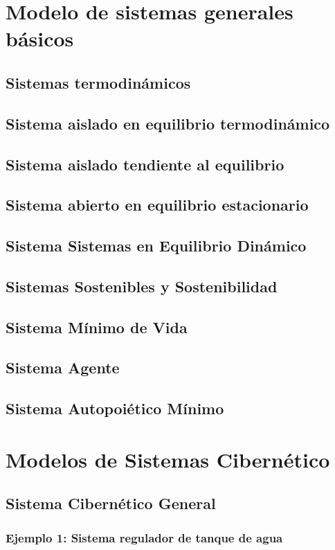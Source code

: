 \section{Modelo de sistemas generales básicos}
\subsection{Sistemas termodinámicos}
\subsection{Sistema aislado en equilibrio termodinámico}
\subsection{Sistema aislado tendiente al equilibrio}
\subsection{Sistema abierto en equilibrio estacionario}
\subsection{Sistema Sistemas en Equilibrio Dinámico}
\subsection{Sistemas Sostenibles y Sostenibilidad}
\subsection{Sistema Mínimo de Vida}
\subsection{Sistema Agente}
\subsection{Sistema Autopoiético Mínimo}
\section{Modelos de Sistemas Cibernético}

\subsection{Sistema Cibernético General}
\subsubsection{Ejemplo 1: Sistema regulador de tanque de agua}
